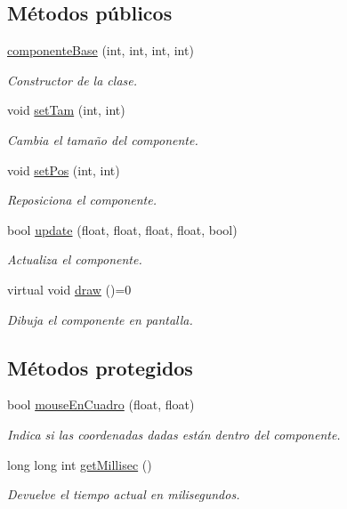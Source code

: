\subsection*{Métodos públicos}
\begin{DoxyCompactItemize}
\item 
\hyperlink{classcomponente_base_a98286225e2be6f2080fe7d409e077a96}{componente\+Base} (int, int, int, int)
\begin{DoxyCompactList}\small\item\em Constructor de la clase. \end{DoxyCompactList}\item 
void \hyperlink{classcomponente_base_af9d40a15747b13d6cf6ac2b7b658a9d4}{set\+Tam} (int, int)
\begin{DoxyCompactList}\small\item\em Cambia el tamaño del componente. \end{DoxyCompactList}\item 
void \hyperlink{classcomponente_base_a3797a3ebadf03c8374d9c7a9460bc645}{set\+Pos} (int, int)
\begin{DoxyCompactList}\small\item\em Reposiciona el componente. \end{DoxyCompactList}\item 
bool \hyperlink{classcomponente_base_a288dc05f1eb5748ba3a24ad651623d49}{update} (float, float, float, float, bool)
\begin{DoxyCompactList}\small\item\em Actualiza el componente. \end{DoxyCompactList}\item 
virtual void \hyperlink{classcomponente_base_ac6faec0698776f8bfe0e817b9927c0f9}{draw} ()=0
\begin{DoxyCompactList}\small\item\em Dibuja el componente en pantalla. \end{DoxyCompactList}\end{DoxyCompactItemize}
\subsection*{Métodos protegidos}
\begin{DoxyCompactItemize}
\item 
bool \hyperlink{classcomponente_base_a2ca6628fb724d45687646a364ad68888}{mouse\+En\+Cuadro} (float, float)
\begin{DoxyCompactList}\small\item\em Indica si las coordenadas dadas están dentro del componente. \end{DoxyCompactList}\item 
long long int \hyperlink{classcomponente_base_a72b7c9497aa4af988a91d16446d26c34}{get\+Millisec} ()
\begin{DoxyCompactList}\small\item\em Devuelve el tiempo actual en milisegundos. \end{DoxyCompactList}\end{DoxyCompactItemize}
